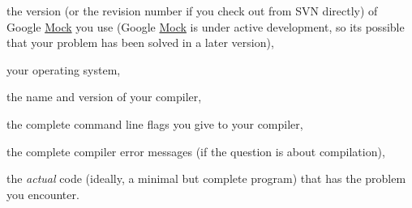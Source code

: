 \begin{DoxyItemize}
\item the version (or the revision number if you check out from S\+VN directly) of Google \mbox{\hyperlink{class_mock}{Mock}} you use (Google \mbox{\hyperlink{class_mock}{Mock}} is under active development, so it\textquotesingle{}s possible that your problem has been solved in a later version),
\item your operating system,
\item the name and version of your compiler,
\item the complete command line flags you give to your compiler,
\item the complete compiler error messages (if the question is about compilation),
\item the {\itshape actual} code (ideally, a minimal but complete program) that has the problem you encounter. 
\end{DoxyItemize}